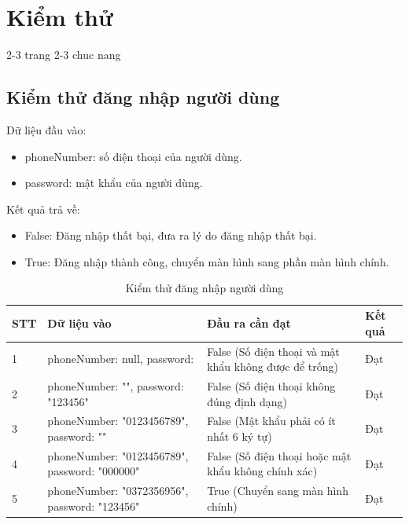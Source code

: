 \documentclass[../DoAn.tex]{subfiles}
\begin{document}
\section{Kiểm thử}
\label{section:4.2}
2-3 trang
2-3 chuc nang

\subsection{Kiểm thử đăng nhập người dùng}
Dữ liệu đầu vào:
\begin{itemize}
    \item phoneNumber: số điện thoại của người dùng.
    \item password: mật khẩu của người dùng.
\end{itemize}
Kết quả trả về:
\begin{itemize}
    \item False: Đăng nhập thất bại, đưa ra lý do đăng nhập thất bại.
    \item True: Đăng nhập thành công, chuyển màn hình sang phần màn hình chính.
\end{itemize}

\begin{table}[H]
    \centering
    \begin{tabular}{|l|l|l|l|}
    \hline
    \textbf{STT} & \textbf{Dữ liệu vào}                          & \textbf{Đầu ra cần đạt}                               & \textbf{Kết quả} \\ \hline
    1            & phoneNumber: null, password:                  & False (Số điện thoại và mật khẩu không được để trống) & Đạt              \\ \hline
    2            & phoneNumber: "", password: "123456"           & False (Số điện thoại không đúng định dạng)            & Đạt              \\ \hline
    3            & phoneNumber: "0123456789", password: ""       & False (Mật khẩu phải có ít nhất 6 ký tự)              & Đạt              \\ \hline
    4 & phoneNumber: "0123456789", password: "000000" & False (Số điện thoại hoặc mật khẩu không chính xác) & Đạt \\ \hline
    5            & phoneNumber: "0372356956", password: "123456" & True (Chuyển sang màn hình chính)                     & Đạt              \\ \hline
    \end{tabular}
\caption{Kiểm thử đăng nhập người dùng}
\label{table:Kiem_thu_dang_nhap_nguoi_dung}
\end{table}
\end{document}
